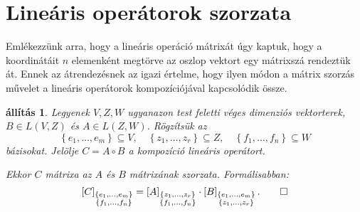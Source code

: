\documentclass[9pt, a4paper, showtrims]{memoir}
\theoremstyle{plain}
\newtheorem{proposition}{állítás}[chapter]
\theoremstyle{remark}
\theoremstyle{definition}
\begin{document}
\section{Lineáris operátorok szorzata}
Emlékezzünk arra, hogy a lineáris operáció mátrixát úgy kaptuk, hogy a koordinátáit $n$ elemenként
megtörve az oszlop vektort egy mátrixszá rendeztük át.
Ennek az átrendezésnek az igazi értelme, hogy ilyen módon a mátrix szorzás művelet a lineáris operátorok kompozíciójával
kapcsolódik össze.
\begin{proposition}
    Legyenek $V,Z,W$ ugyanazon test feletti véges dimenziós vektorterek,
    $B \in L\left( V,Z \right)$ és $A \in L\left( Z,W \right)$.
    Rögzítsük az 
    \[
        \left\{ e_1,\dots,e_m \right\}\subseteq V,\quad
        \left\{ z_1,\dots,z_r \right\}\subseteq Z,\quad
        \left\{ f_1,\dots,f_n \right\}\subseteq W
    \]
    bázisokat.
    Jelölje $C=A\circ B$ a kompozíció lineáris operátort.

    Ekkor $C$ mátrixa az $A$ és $B$ mátrixának szorzata.
    Formálisabban:
    \[
        \left[ C \right]_{\substack{\left\{ e_1,\dots,e_m \right\}\\ \left\{ f_1,\dots,f_n \right\}}}
        =
        \left[ A \right]_{\substack{\left\{ z_1,\dots,z_r \right\}\\ \left\{ f_1,\dots,f_n \right\}}}
        \cdot
        \left[ B \right]_{\substack{\left\{ e_1,\dots,e_m \right\}\\ \left\{ z_1,\dots,z_r \right\}}}.\qedhere
    \]
\end{proposition}
\end{document}
